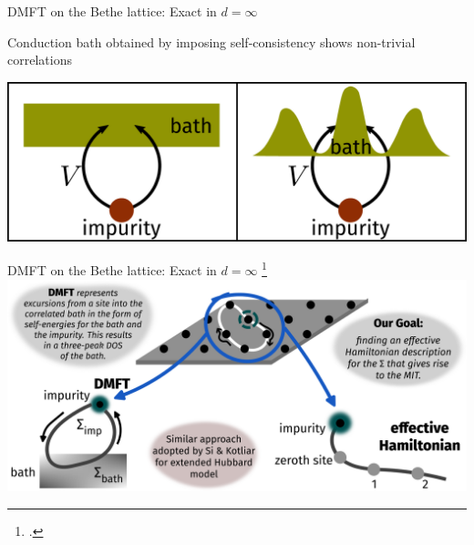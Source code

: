 \documentclass[9pt,aspectratio=169]{beamer}
\begin{document}
\begin{frame}{DMFT on the Bethe lattice: Exact in \(d=\infty\)}
\begin{itemize}
\begin{minipage}{0.4\textwidth}
\nitem Conduction bath obtained by imposing self-consistency shows \alert{non-trivial correlations}
\end{minipage}
\hspace*{\fill}
\begin{minipage}{0.45\textwidth}
\includegraphics[width=\textwidth]{dos_diff.pdf}
\end{minipage}
\end{itemize}
	
\end{frame}

\begin{frame}{DMFT on the Bethe lattice: Exact in \(d=\infty\)}
\footcite{si_kotliar_1993,Kotliar_1993}
\centering
\hspace*{-20pt}\includegraphics[width=1.1\textwidth]{contrast2.pdf}
\end{frame}
\end{document}
